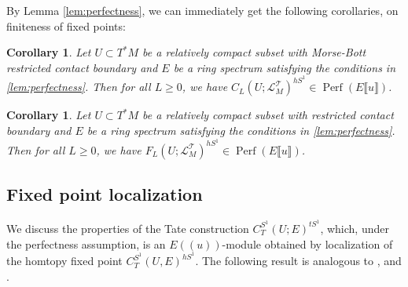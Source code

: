 \documentclass[11pt]{amsart}
\numberwithin{equation}{section}
\theoremstyle{plain}
\newtheorem{Coro}[coro]{Corollary}
\theoremstyle{definition}
\theoremstyle{remark}
\newcommand{\sT} { {\mathscr{T}}}
\newcommand{\fpw}[1]{{\llbracket #1\rrbracket}}
\newcommand{\fls}[1]{{(\!(#1 )\!) }}
\newcommand\Perf{\operatorname{Perf}}
\begin{document}
By Lemma \ref{lem:perfectness}, we can immediately get the following corollaries, on finiteness of fixed points:

\begin{Coro}\label{corollary: equivariant perfectness for costalk}
Let $U\subset T^*M$ be a relatively compact subset with Morse-Bott restricted contact boundary and $E$ be a ring spectrum satisfying the conditions in \autoref{lem:perfectness}. Then for all $L\geq 0$, we have $C_L(U; \mathscr{L}_M^\sT)^{hS^1} \in \Perf(E\fpw{u})$.
\end{Coro}
\begin{Coro}\label{corollary: equivariant perfectness for stalk}
Let $U\subset T^*M$ be a relatively compact subset with restricted contact boundary and $E$ be a ring spectrum satisfying the conditions in \autoref{lem:perfectness}. Then for all $L\geq 0$, we have $F_L(U; \mathscr{L}_M^\sT)^{hS^1} \in \Perf(E\fpw{u})$.
\end{Coro}

\subsection{Fixed point localization}
We discuss the properties of the Tate construction $C_T^{S^1}(U; E)^{tS^1}$, which, under the perfectness assumption, is an $E\fls{u}$-module obtained by localization of the homtopy fixed point $C_T^{S^1}(U, E)^{hS^1}$. The following result is analogous to \cite[Theorem 1.1]{zhaoperiodic}, \cite[Theorem 1.1]{AlbersCieliebakFrauenfelder2016} and \cite[Theorem 4.1]{CoteKartal24}.
\end{document}

